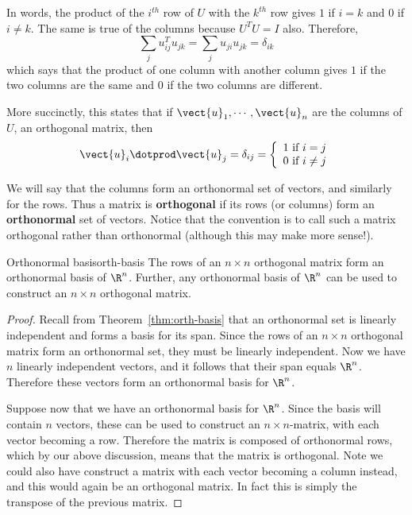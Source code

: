 In words, the product of the $i^{th}$ row of $U$ with the $k^{th}$ row
gives $1$ if $i=k$ and $0$ if $i\neq k$. The same is true of the columns because 
$U^{T}U=I$ also. Therefore, 
\begin{equation*}
\sum_{j}u_{ij}^{T}u_{jk}=\sum_{j}u_{ji}u_{jk}=\delta _{ik}
\end{equation*}
which says that the product of one column with another column gives $1$ if the two
columns are the same and $0$ if the two columns are different.

More succinctly, this states that if $\vect{u}_{1},\cdots ,\vect{u}_{n}$
are the columns of $U$, an orthogonal matrix, then 
\[
\vect{u}_{i}\dotprod \vect{u}_{j}=\delta _{ij} = \left\{
\begin{array}{c}
1\text{ if }i=j \\ 
0\text{ if }i\neq j
\end{array}
\right.  
\]

We will say that the columns form an orthonormal set of vectors, and similarly for the rows. Thus a matrix is \textbf{orthogonal} if its rows (or columns) form an
\textbf{orthonormal} set of vectors. Notice that the convention is to call such a matrix orthogonal rather than orthonormal (although this may make more sense!). 

\begin{proposition}{Orthonormal basis}{orth-basis}
The rows of an $n \times n$ orthogonal matrix form an orthonormal
basis of $\R^n$. Further, any orthonormal basis of
$\R^n$ can be used to construct an $n \times n$ orthogonal
matrix.
\end{proposition}

\begin{proof}
Recall from Theorem~\ref{thm:orth-basis} that an orthonormal set is
linearly independent and forms a basis for its span. Since the rows of
an $n \times n$ orthogonal matrix form an orthonormal set, they must
be linearly independent. Now we have $n$ linearly independent vectors,
and it follows that their span equals $\R^n$. Therefore these
vectors form an orthonormal basis for $\R^n$.

Suppose now that we have an orthonormal basis for $\R^n$. Since the
basis will contain $n$ vectors, these can be used to construct an $n
\times n$-matrix, with each vector becoming a row. Therefore the
matrix is composed of orthonormal rows, which by our above discussion,
means that the matrix is orthogonal. Note we could also have construct
a matrix with each vector becoming a column instead, and this would
again be an orthogonal matrix. In fact this is simply the transpose of
the previous matrix.
\end{proof}

